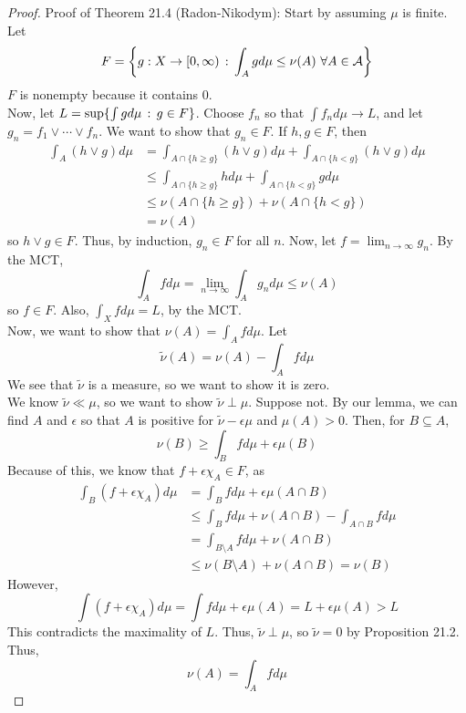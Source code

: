 \begin{proof}{Proof of Theorem 21.4 (Radon-Nikodym):}
    Start by assuming $\mu$ is finite. Let
    \[ F = \left\{g : X \to [0, \infty) \, :\, \int_{A} g d\mu \leq \nu(A)\ \forall A \in \mathcal{A}\right\} \]
    $F$ is nonempty because it contains $0$.\\

    Now, let $L = \sup\{\int g d\mu \, :\, g \in F\}$. Choose $f_n$ so that $\int f_n d\mu \to L$, and let $g_n = f_1 \vee \cdots \vee f_n$. We want to show that $g_n \in F$. If $h, g \in F$, then
    \begin{align*}
        \int_{A} (h \vee g) d\mu &= \int_{A \cap \{h \geq g\}} (h \vee g) d\mu + \int_{A \cap \{h < g\}} (h \vee g) d\mu\\
        &\leq \int_{A \cap \{h \geq g\}} h d\mu + \int_{A \cap \{h < g\}} g d\mu\\
        &\leq \nu(A \cap \{h \geq g\}) + \nu(A \cap \{h < g\})\\
        &= \nu(A)
    \end{align*}
    so $h \vee g \in F$. Thus, by induction, $g_n \in F$ for all $n$. Now, let $f = \lim_{n \to \infty} g_n$. By the MCT,
    \[ \int_{A} f d\mu = \lim_{n \to \infty} \int_{A} g_n d\mu \leq \nu(A) \]
    so $f \in F$. Also, $\int_{X} f d\mu = L$, by the MCT.\\

    Now, we want to show that $\nu(A) = \int_{A} f d\mu$. Let
    \[ \tilde{\nu}(A) = \nu(A) - \int_{A} f d\mu \]
    We see that $\tilde{\nu}$ is a measure, so we want to show it is zero.\\

    We know $\tilde{\nu} \ll \mu$, so we want to show $\tilde{\nu} \perp \mu$. Suppose not. By our lemma, we can find $A$ and $\epsilon$ so that $A$ is positive for $\tilde{\nu} - \epsilon\mu$ and $\mu(A) > 0$. Then, for $B \subseteq A$,
    \[ \nu(B) \geq \int_{B} f d\mu + \epsilon\mu(B) \]
    Because of this, we know that $f + \epsilon\chi_{A} \in F$, as
    \begin{align*}
        \int_{B} (f + \epsilon\chi_{A}) d\mu &= \int_{B} f d\mu + \epsilon\mu(A \cap B)\\
        &\leq \int_{B} f d\mu + \nu(A \cap B) - \int_{A \cap B} f d\mu\\
        &= \int_{B \setminus A} f d\mu + \nu(A \cap B)\\
        &\leq \nu(B \setminus A) + \nu(A \cap B) = \nu(B)
    \end{align*}
    However,
    \[ \int (f + \epsilon\chi_{A}) d\mu = \int f d\mu + \epsilon\mu(A) = L + \epsilon\mu(A) > L \]
    This contradicts the maximality of $L$. Thus, $\tilde{\nu} \perp \mu$, so $\tilde{\nu} = 0$ by Proposition 21.2. Thus,
    \[ \nu(A) = \int_{A} f d\mu \]


\end{proof}
